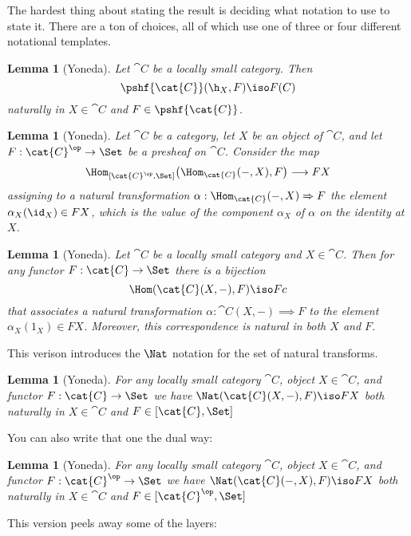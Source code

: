 \documentclass[12pt]{article}
\newtheorem{lemma}[thm]{Lemma}
\theoremstyle{definition}
\theoremstyle{remark}
\numberwithin{equation}{section}
\begin{document}
The hardest thing about stating the result is deciding what notation to use to state it.
There are a ton of choices, all of which use one of three or four different notational
templates.

\begin{lemma}[Yoneda]   
\label{yoneda1}
Let $\cat{C}$ be a locally small category.  Then
% 
\begin{equation}        
\label{eq:yoneda}
\pshf{\cat{C}}(\h_X, F)
\iso
F(C)
\end{equation}
% 
naturally in $X \in \cat{C}$ and $F \in \pshf{\cat{C}}$.  
\end{lemma}

\begin{lemma}[Yoneda]\label{yoneda2}
 Let $\cat{C}$ be a category, let $X$ be an object of $\cat{C}$, and let $F:\cat{C}^\op\to\Set$ be a presheaf on $\cat{C}$. 
 Consider the map 
 $$
 \Hom_{[\cat{C}^\op,\Set]} \big( \Hom_\cat{C} (-,X) , F \big) \longrightarrow FX
 $$
 assigning to a natural transformation $\alpha:\Hom_\cat{C} (-,X)\Rightarrow F$ the element $\alpha_X(\id_X)\in FX$, which is the value of the component $\alpha_X$ of $\alpha$ on the identity at $X$. 
\end{lemma}


\begin{lemma}[Yoneda]\label{yoneda3} Let $\cat{C}$ be a locally small category and $X \in
\cat{C}$. Then for any functor $F : \cat{C} \to \Set$ there is a bijection
$$
\Hom(\cat{C}(X,-), F) \iso Fc
$$
that associates a natural transformation $\alpha:\cat{C}(X,-) \implies F$ to the element
$\alpha_X(1_X) \in FX$. Moreover, this correspondence is natural in both $X$ and $F$.
\end{lemma}

\noindent This verison introduces the $\Nat$ notation for the set of natural transforms.

\begin{lemma}[Yoneda]\label{yoneda4} For any locally small category $\cat{C}$, object $X
\in \cat{C}$, and functor $F:\cat{C} \to \Set$ we have  $\Nat(\cat{C}(X,-),F) \iso FX$
both naturally in $X \in \cat{C}$ and $F \in [\cat{C}, \Set]$
\end{lemma}

\noindent You can also write that one the dual way:
\begin{lemma}[Yoneda]\label{yoneda4-dual} For any locally small category $\cat{C}$, object
$X \in \cat{C}$, and functor $F:\cat{C}^{\op} \to \Set$ we have  $\Nat(\cat{C}(-,X),F)
\iso FX$ both naturally in $X \in \cat{C}$ and $F \in [\cat{C}^{\op}, \Set]$
\end{lemma}
\noindent
This version peels away some of the layers:
\end{document}
